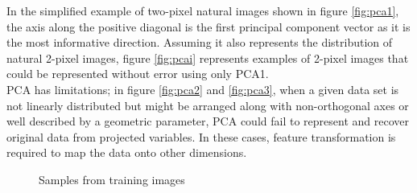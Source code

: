 \documentclass[journal]{IEEEtran}
\begin{document}
In the simplified example of two-pixel natural images shown in figure \ref{fig:pca1}, the axis along the positive diagonal is the first principal component vector as it is the most informative direction. Assuming it also represents the distribution of natural 2-pixel images, figure \ref{fig:pcai} represents examples of 2-pixel images that could be represented without error using only PCA1.\\
PCA has limitations; in figure \ref{fig:pca2} and \ref{fig:pca3},  when a given data set is not linearly distributed but might be arranged along with non-orthogonal axes or well described by a geometric parameter, PCA could fail to represent and recover original data from projected variables. In these cases, feature transformation is required to map the data onto other dimensions.\\
\begin{figure}[htbp]
\centering     %
{}
\caption{Samples from training images}
\end{figure}
\end{document}
